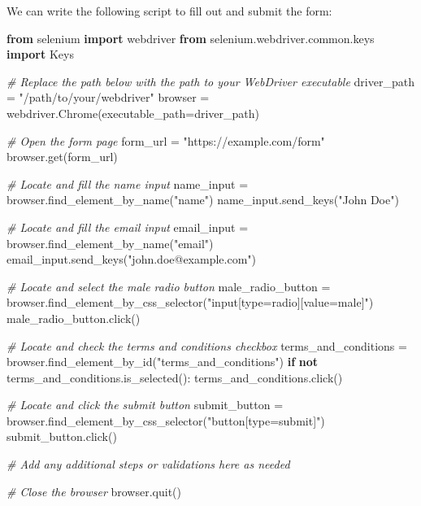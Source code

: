 \documentclass[
  paper=a4,
  ,captions=tableheading
]{scrartcl}
\newenvironment{Shaded}{}{}
\newcommand{\CommentTok}[1]{\textcolor[rgb]{0.38,0.63,0.69}{\textit{#1}}}
\newcommand{\ControlFlowTok}[1]{\textcolor[rgb]{0.00,0.44,0.13}{\textbf{#1}}}
\newcommand{\ImportTok}[1]{\textcolor[rgb]{0.00,0.50,0.00}{\textbf{#1}}}
\newcommand{\KeywordTok}[1]{\textcolor[rgb]{0.00,0.44,0.13}{\textbf{#1}}}
\newcommand{\NormalTok}[1]{#1}
\newcommand{\OperatorTok}[1]{\textcolor[rgb]{0.40,0.40,0.40}{#1}}
\newcommand{\StringTok}[1]{\textcolor[rgb]{0.25,0.44,0.63}{#1}}
\begin{document}
We can write the following script to fill out and submit the form:

\begin{Shaded}
\begin{Highlighting}[]
\ImportTok{from}\NormalTok{ selenium }\ImportTok{import}\NormalTok{ webdriver}
\ImportTok{from}\NormalTok{ selenium.webdriver.common.keys }\ImportTok{import}\NormalTok{ Keys}

\CommentTok{\# Replace the path below with the path to your WebDriver executable}
\NormalTok{driver\_path }\OperatorTok{=} \StringTok{"/path/to/your/webdriver"}
\NormalTok{browser }\OperatorTok{=}\NormalTok{ webdriver.Chrome(executable\_path}\OperatorTok{=}\NormalTok{driver\_path)}

\CommentTok{\# Open the form page}
\NormalTok{form\_url }\OperatorTok{=} \StringTok{"https://example.com/form"}
\NormalTok{browser.get(form\_url)}

\CommentTok{\# Locate and fill the name input}
\NormalTok{name\_input }\OperatorTok{=}\NormalTok{ browser.find\_element\_by\_name(}\StringTok{"name"}\NormalTok{)}
\NormalTok{name\_input.send\_keys(}\StringTok{"John Doe"}\NormalTok{)}

\CommentTok{\# Locate and fill the email input}
\NormalTok{email\_input }\OperatorTok{=}\NormalTok{ browser.find\_element\_by\_name(}\StringTok{"email"}\NormalTok{)}
\NormalTok{email\_input.send\_keys(}\StringTok{"john.doe@example.com"}\NormalTok{)}

\CommentTok{\# Locate and select the male radio button}
\NormalTok{male\_radio\_button }\OperatorTok{=}\NormalTok{ browser.find\_element\_by\_css\_selector(}\StringTok{"input[type=\textquotesingle{}radio\textquotesingle{}][value=\textquotesingle{}male\textquotesingle{}]"}\NormalTok{)}
\NormalTok{male\_radio\_button.click()}

\CommentTok{\# Locate and check the terms and conditions checkbox}
\NormalTok{terms\_and\_conditions }\OperatorTok{=}\NormalTok{ browser.find\_element\_by\_id(}\StringTok{"terms\_and\_conditions"}\NormalTok{)}
\ControlFlowTok{if} \KeywordTok{not}\NormalTok{ terms\_and\_conditions.is\_selected():}
\NormalTok{    terms\_and\_conditions.click()}

\CommentTok{\# Locate and click the submit button}
\NormalTok{submit\_button }\OperatorTok{=}\NormalTok{ browser.find\_element\_by\_css\_selector(}\StringTok{"button[type=\textquotesingle{}submit\textquotesingle{}]"}\NormalTok{)}
\NormalTok{submit\_button.click()}

\CommentTok{\# Add any additional steps or validations here as needed}

\CommentTok{\# Close the browser}
\NormalTok{browser.quit()}
\end{Highlighting}
\end{Shaded}
\end{document}
